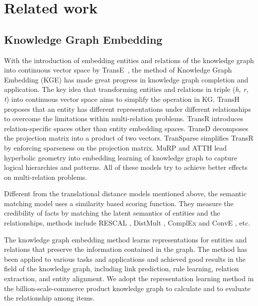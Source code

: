 \section{Related work}

\subsection{Knowledge Graph Embedding}
With the introduction of embedding entities and relations of the knowledge graph into continuous vector space by TransE~\cite{TransE-Bordes-2013}, the method of Knowledge Graph Embedding (KGE) has made great progress in knowledge graph completion and application. The key idea that transforming entities and relations in triple (\textit{h, r, t}) into continuous vector space aims to simplify the operation in KG. TransH \cite{TransH-Wang-2014} proposes that an entity has different representations under different relationships to overcome the limitations within multi-relation problems. TransR \cite{TransR-Lin-2015} introduces relation-specific spaces other than entity embedding spaces. TransD \cite{TransD-Ji-2015} decomposes the projection matrix into a product of two vectors. TranSparse \cite{TranSparse-Ji-2016} simplifies TransR by enforcing sparseness on the projection matrix. MuRP\cite{DBLP:conf/nips/BalazevicAH19} and ATTH\cite{DBLP:conf/acl/ChamiWJSRR20} lead hyperbolic geometry into embedding learning of knowledge graph to capture logical hierarchies and patterns. All of these models try to achieve better effects on multi-relation problems.

Different from the translational distance models mentioned above, the semantic matching model uses a similarity based scoring function. They measure the credibility of facts by matching the latent semantics of entities and the relationships, methods include RESCAL \cite{RESCAL-Nickel-2011}, DistMult \cite{DistMult-Yang-2015}, ComplEx \cite{ComplEx-Trouillon-2016} and ConvE \cite{ConvE-Dettmers-2018}, etc.

The knowledge graph embedding method learns representations for entities and relations that preserve the information contained in the graph. The method has been applied to various tasks and applications and achieved good results in the field of the knowledge graph, including link prediction\cite{CrossE}, rule learning\cite{IterE}, relation extraction\cite{LFDS}, and entity alignment\cite{sun2018bootstrapping}. We adopt the representation learning method in the  billion-scale-commerce product knowledge graph to calculate and to evaluate the relationship among items.

